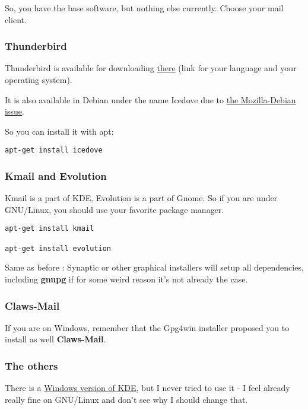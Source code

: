 So, you have the base software, but nothing else currently. Choose your
mail client.

\subsubsection{Thunderbird}\label{thunderbird}

Thunderbird is available for downloading
\href{https://www.mozilla.org/en-US/thunderbird/}{there} (link for your
language and your operating system).

It is also available in Debian under the name Icedove due to
\href{http://en.wikipedia.org/wiki/Mozilla_Corporation_software_rebranded_by_the_Debian_project}{the
Mozilla-Debian issue}.

So you can install it with apt:

\begin{verbatim}
apt-get install icedove
\end{verbatim}

\subsubsection{Kmail and Evolution}\label{kmail-and-evolution}

Kmail is a part of KDE, Evolution is a part of Gnome. So if you are
under GNU/Linux, you should use your favorite package manager.

\begin{verbatim}
apt-get install kmail

apt-get install evolution
\end{verbatim}

Same as before : Synaptic or other graphical installers will setup all
dependencies, including \textbf{gnupg} if for some weird reason it's not
already the case.

\subsubsection{Claws-Mail}\label{claws-mail}

If you are on Windows, remember that the Gpg4win installer proposed you
to install as well \textbf{Claws-Mail}.

\subsubsection{The others}\label{the-others}

There is a \href{https://windows.kde.org/}{Windows version of KDE}, but
I never tried to use it - I feel already really fine on GNU/Linux and
don't see why I should change that.

